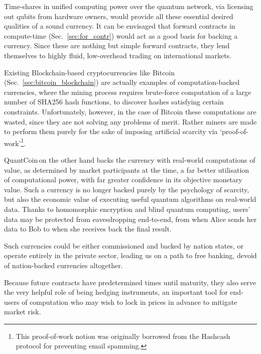 Time-shares in unified computing power over the quantum network, via licensing out qubits from hardware owners, would provide all these essential desired qualities of a sound currency. It can be envisaged that forward contracts in compute-time (Sec.~\ref{sec:for_contr}) would act as a good basis for backing a currency. Since these are nothing but simple forward contracts, they lend themselves to highly fluid, low-overhead trading on international markets.

Existing Blockchain-based cryptocurrencies like Bitcoin (Sec.~\ref{sec:bitcoin_blockchain}) are actually examples of computation-backed currencies, where the mining process requires brute-force computation of a large number of SHA256 hash functions, to discover hashes satisfying certain constraints. Unfortunately, however, in the case of Bitcoin these computations are wasted, since they are not solving any problems of merit. Rather miners are made to perform them purely for the sake of imposing artificial scarcity via `proof-of-work'\footnote{This proof-of-work notion was originally borrowed from the Hashcash protocol for preventing email spamming.}.

QuantCoin\texttrademark\,on the other hand backs the currency with real-world computations of value, as determined by market participants at the time, a far better utilisation of computational power, with far greater confidence in its objective monetary value. Such a currency is no longer backed purely by the psychology of scarcity, but also the economic value of executing useful quantum algorithms on real-world data. Thanks to homomorphic encryption and blind quantum computing, users' data may be protected from eavesdropping end-to-end, from when Alice sends her data to Bob to when she receives back the final result.

Such currencies could be either commissioned and backed by nation states, or operate entirely in the private sector, leading us on a path to free banking, devoid of nation-backed currencies altogether.

Because future contracts have predetermined times until maturity, they also serve the very helpful role of being hedging instruments, an important tool for end-users of computation who may wish to lock in prices in advance to mitigate market risk.

